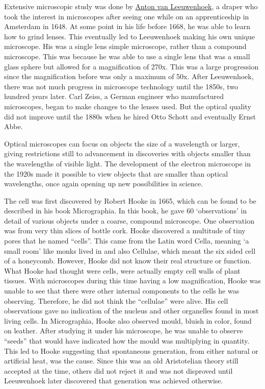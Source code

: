 Extensive microscopic study was done by \href{https://en.wikipedia.org/wiki/Antonie_van_Leeuwenhoek}{Anton van Leeuwenhoek}, a draper who took the interest in microscopes after seeing one while on an apprenticeship in Amsterdam in 1648. At some point in his life before 1668, he was able to learn how to grind lenses. This eventually led to Leeuwenhoek making his own unique microscope. His was a single lens simple microscope, rather than a compound microscope. This was because he was able to use a single lens that was a small glass sphere but allowed for a magnification of 270x. This was a large progression since the magnification before was only a maximum of 50x. After Leeuwenhoek, there was not much progress in microscope technology until the 1850s, two hundred years later. Carl Zeiss, a German engineer who manufactured microscopes, began to make changes to the lenses used. But the optical quality did not improve until the 1880s when he hired Otto Schott and eventually Ernst Abbe.

Optical microscopes can focus on objects the size of a wavelength or larger, giving restrictions still to advancement in discoveries with objects smaller than the wavelengths of visible light. The development of the electron microscope in the 1920s made it possible to view objects that are smaller than optical wavelengths, once again opening up new possibilities in science.

The cell was first discovered by Robert Hooke in 1665, which can be found to be described in his book Micrographia. In this book, he gave 60 `observations' in detail of various objects under a coarse, compound microscope. One observation was from very thin slices of bottle cork. Hooke discovered a multitude of tiny pores that he named ``cells''. This came from the Latin word Cella, meaning `a small room' like monks lived in and also Cellulae, which meant the six sided cell of a honeycomb. However, Hooke did not know their real structure or function. What Hooke had thought were cells, were actually empty cell walls of plant tissues. With microscopes during this time having a low magnification, Hooke was unable to see that there were other internal components to the cells he was observing. Therefore, he did not think the ``cellulae'' were alive. His cell observations gave no indication of the nucleus and other organelles found in most living cells. In Micrographia, Hooke also observed mould, bluish in color, found on leather. After studying it under his microscope, he was unable to observe ``seeds'' that would have indicated how the mould was multiplying in quantity. This led to Hooke suggesting that spontaneous generation, from either natural or artificial heat, was the cause. Since this was an old Aristotelian theory still accepted at the time, others did not reject it and was not disproved until Leeuwenhoek later discovered that generation was achieved otherwise.

